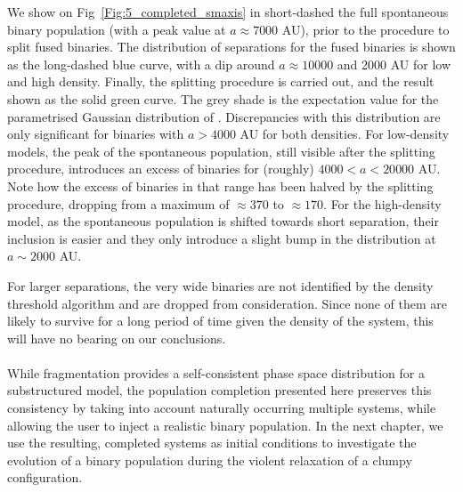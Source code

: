 We show on Fig~\ref{Fig:5_completed_smaxis} in short-dashed  the full spontaneous binary population (with a peak value at $a \approx 7 000$ AU), prior to the procedure to split fused binaries. The distribution of separations for the fused binaries is shown as the long-dashed blue curve, with a dip around $ a \approx 10 000$ and 2000 AU for low and high density. Finally, the splitting procedure is carried out, and the result shown as the solid green curve. The grey shade is the expectation value for
the parametrised Gaussian distribution of \cite{Raghavan2010}. Discrepancies with this distribution are only significant for binaries with $a > 4 000$ AU for both densities. For low-density models, the peak of the spontaneous population, still visible after the splitting procedure, introduces an excess of binaries for (roughly)  $ 4 000 < a < 20 000 $ AU. Note how the excess of binaries in that range has been halved by the splitting procedure, dropping from a maximum of $\approx 370$ to $ \approx 170$. For the high-density model, as the spontaneous population is shifted towards short separation, their inclusion is easier and they only introduce a slight bump in the distribution at $ a \sim 2 000 $ AU.

 For larger separations, the very wide binaries are not identified by the density threshold algorithm and are dropped from consideration. Since none of them are likely to survive for a long period of time given the density of the system, this will have no bearing on our conclusions. 

\paragraph*{}
While \HubLem fragmentation provides a self-consistent phase space distribution for a substructured model, the population completion presented here preserves this consistency by taking into account naturally occurring multiple systems, while allowing the user to inject a realistic binary population. In the next chapter, we use the resulting, completed systems as initial conditions to investigate the evolution of a binary population during the violent relaxation of a clumpy configuration.



